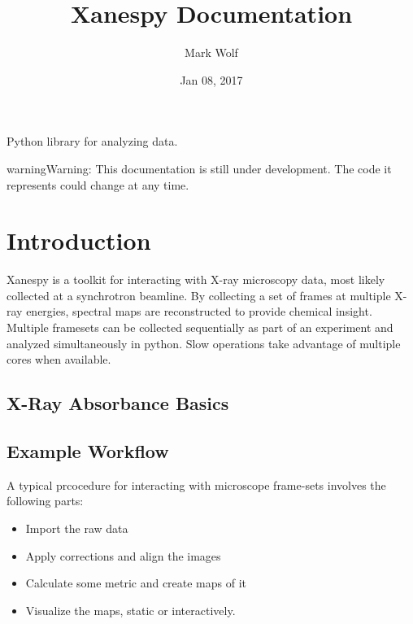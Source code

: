\documentclass[letterpaper,10pt,english]{sphinxmanual}
\title{Xanespy Documentation}
\date{Jan 08, 2017}
\author{Mark Wolf}
\begin{document}
\maketitle
\sphinxtableofcontents
{}\label{\detokenize{index::doc}}


Python library for analyzing  data.

\begin{sphinxadmonition}{warning}{Warning:}
This documentation is still under development. The code
it represents could change at any time.
\end{sphinxadmonition}


\chapter{Introduction}
\label{\detokenize{intro::doc}}\label{\detokenize{intro:introduction}}\label{\detokenize{intro:xanespy-documentation}}
Xanespy is a toolkit for interacting with X-ray microscopy data, most
likely collected at a synchrotron beamline. By collecting a set of
frames at multiple X-ray energies, spectral maps are reconstructed to
provide chemical insight. Multiple framesets can be collected
sequentially as part of an  experiment and analyzed
simultaneously in python. Slow operations take advantage of multiple
cores when available.


\section{X-Ray Absorbance Basics}
\label{\detokenize{intro:x-ray-absorbance-basics}}

\section{Example Workflow}
\label{\detokenize{intro:example-workflow}}
A typical prcocedure for interacting with microscope frame-sets involves the following parts:
\begin{itemize}
\item {} 
Import the raw data

\item {} 
Apply corrections and align the images

\item {} 
Calculate some metric and create maps of it

\item {} 
Visualize the maps, static or interactively.

\end{itemize}
\end{document}
